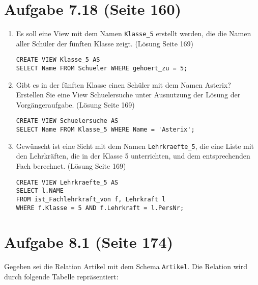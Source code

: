 \documentclass{bschlangaul-haupt}
\begin{document}
%

\section{Aufgabe 7.18 (Seite 160)}

\begin{enumerate}
\item Es soll eine View mit dem Namen \verb|Klasse_5| erstellt werden,
die die Namen aller Schüler der fünften Klasse zeigt. (Lösung Seite 169)

\begin{verbatim}
CREATE VIEW Klasse_5 AS
SELECT Name FROM Schueler WHERE gehoert_zu = 5;
\end{verbatim}

\item Gibt es in der fünften Klasse einen Schüler mit dem Namen Asterix?
Erstellen Sie eine View Schuelersuche unter Ausnutzung der Lösung der
Vorgängeraufgabe. (Lösung Seite 169)

\begin{verbatim}
CREATE VIEW Schuelersuche AS
SELECT Name FROM Klasse_5 WHERE Name = 'Asterix';
\end{verbatim}

\item Gewünscht ist eine Sicht mit dem Namen \verb|Lehrkraefte_5|, die
eine Liste mit den Lehrkräften, die in der Klasse 5 unterrichten, und
dem entsprechenden Fach berechnet. (Lösung Seite 169)

\begin{verbatim}
CREATE VIEW Lehrkraefte_5 AS
SELECT l.NAME
FROM ist_Fachlehrkraft_von f, Lehrkraft l
WHERE f.Klasse = 5 AND f.Lehrkraft = l.PersNr;
\end{verbatim}

\end{enumerate}

%

\section{Aufgabe 8.1 (Seite 174)}

Gegeben sei die Relation Artikel mit dem Schema
\texttt{Artikel}. Die
Relation wird durch folgende Tabelle repräsentiert:
\end{document}
